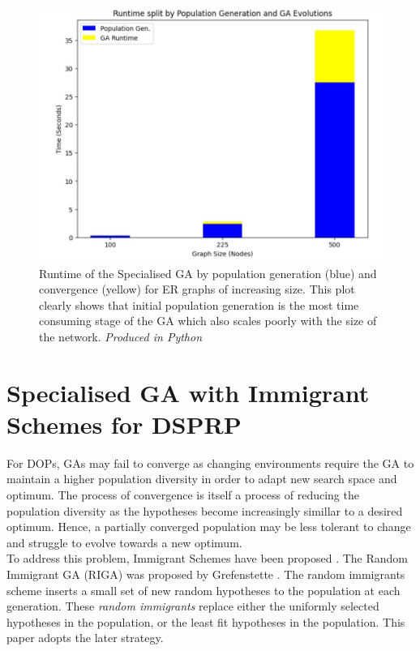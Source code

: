\documentclass[
	a4paper, %
	10pt, %
	unnumberedsections, %
	twoside, %
]{LTJournalArticle}
\begin{document}
\begin{figure}[H]
	\includegraphics[width=\linewidth]{Figures/sssp/runtime.jpg}
	\caption{Runtime of the Specialised GA by population generation (blue) and convergence (yellow) for ER graphs of increasing size. This plot clearly shows that initial population generation is the most time consuming stage of the GA which also scales poorly with the size of the network. \emph{Produced in Python}}
	\label{fig:sssp_runtime}
\end{figure}

\section{Specialised GA with Immigrant Schemes for DSPRP} 

For DOPs, GAs may fail to converge as changing environments require the GA to maintain a higher population diversity in order to adapt new search space and optimum. The process of convergence is itself a process of reducing the population diversity as the hypotheses become increasingly simillar to a desired optimum. Hence, a partially converged population may be less tolerant to change and struggle to evolve towards a new optimum. \\

To address this problem, Immigrant Schemes have been proposed \cite{yang:10}. The Random Immigrant GA (RIGA) was proposed by Grefenstette \cite{}. The random immigrants scheme inserts a small set of new random hypotheses to the population at each generation. These \emph{random immigrants} replace either the uniformly selected hypotheses in the population, or the least fit hypotheses in the population. This paper adopts the later strategy.  \\
\end{document}
